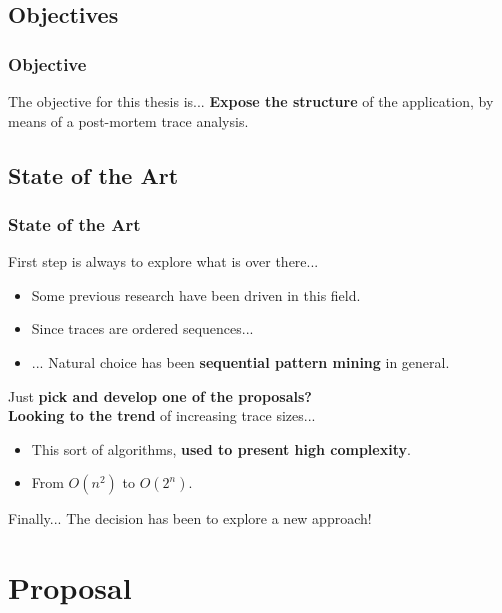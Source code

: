 \documentclass{beamer}
\begin{document}
\subsection{Objectives}
\begin{frame}
\frametitle{Objective}
	\begin{exampleblock}{The objective for this thesis is...}
		\textbf{Expose the structure} of the application, by means of a post-mortem trace analysis.
	\end{exampleblock}
\end{frame}

\subsection{State of the Art}

\begin{frame}
\frametitle{State of the Art}
	First step is always to explore what is over there...
	\begin{itemize}
		\item Some previous research have been driven in this field.
		\item Since traces are ordered sequences...
		\item ... Natural choice has been \textbf{sequential pattern mining} in general.
	\end{itemize}
	\vfill
	\pause
	Just \textbf{pick and develop one of the proposals?}\\
	\pause
	\vfill
	\textbf{Looking to the trend} of increasing trace sizes...\\
	\begin{itemize}
		\item This sort of algorithms, \textbf{used to present high complexity}.
		\item From $O(n^{2})$ to $O(2^{n})$.
	\end{itemize}
	\pause
	\begin{block}{Finally...}
		The decision has been to explore a new approach!
	\end{block}
\end{frame}

\section{Proposal}
\end{document}

